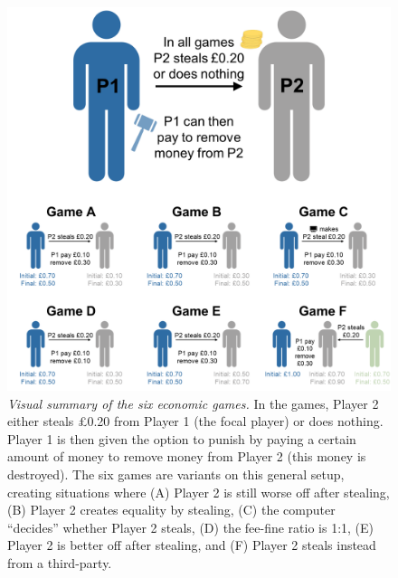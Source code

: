 \documentclass[
  english,
  man, donotrepeattitle,floatsintext]{apa6}
\begin{document}
\begin{figure}
\includegraphics[width=1\linewidth]{images/games} \caption{\emph{Visual summary of the six economic games.} In the
games, Player 2 either steals £0.20 from Player 1 (the focal player) or does
nothing. Player 1 is then given the option to punish by paying a certain amount
of money to remove money from Player 2 (this money is destroyed). The six games
are variants on this general setup, creating situations where (A) Player 2 is
still worse off after stealing, (B) Player 2 creates equality by stealing, (C)
the computer ``decides'' whether Player 2 steals, (D) the fee-fine ratio is 1:1,
(E) Player 2 is better off after stealing, and (F) Player 2 steals instead from
a third-party.}\label{fig:plotGames}
\end{figure}
\end{document}
